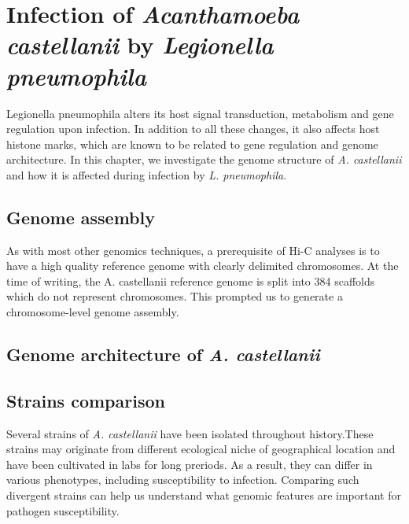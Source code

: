
\chapter{Infection of \textit{Acanthamoeba castellanii} by \textit{Legionella pneumophila}} %

\label{ch:02-02} %


Legionella pneumophila alters its host signal transduction, metabolism and gene regulation upon infection. In addition to all these changes, it also affects host histone marks, which are known to be related to gene regulation and genome architecture. In this chapter, we investigate the genome structure of \textit{A. castellanii} and how it is affected during infection by \textit{L. pneumophila}.

\section{Genome assembly}

As with most other genomics techniques, a prerequisite of Hi-C analyses is to have a high quality reference genome with clearly delimited chromosomes. At the time of writing, the A. castellanii reference genome is split into 384 scaffolds which do not represent chromosomes. This prompted us to generate a chromosome-level genome assembly.

\section{Genome architecture of \textit{A. castellanii}}

\section{Strains comparison}

Several strains of \textit{A. castellanii} have been isolated throughout history.These strains may originate from different ecological niche of geographical location and have been cultivated in labs for long preriods. As a result, they can differ in various phenotypes, including susceptibility to infection. Comparing such divergent strains can help us understand what genomic features are important for pathogen susceptibility.


